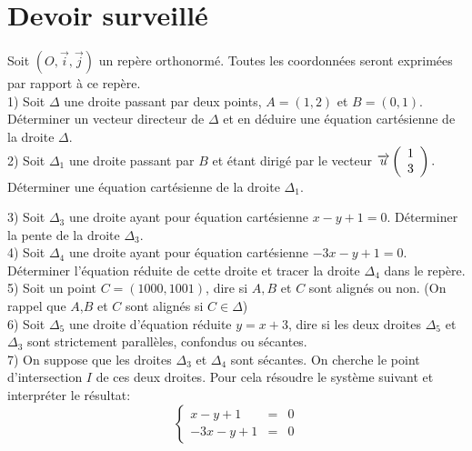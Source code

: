 \documentclass[french]{book}
\begin{document}
 \section*{Devoir surveillé }
Soit $(O,\overrightarrow{i},\overrightarrow{j})$ un repère orthonormé. Toutes les coordonnées seront exprimées par rapport à ce repère. \\


1) Soit $\Delta$ une droite passant par deux points, $A=(1,2)$ et $B=(0,1)$. Déterminer un vecteur directeur de $\Delta$ et en déduire une équation cartésienne de la droite $\Delta$. \\


2) Soit $\Delta_1 $ une droite passant par $B$ et étant dirigé par le vecteur $\overrightarrow{u} \left( \begin{array}{c}
1 \\
3 \\
\end{array} \right). \\
$
Déterminer  une équation cartésienne de la droite $\Delta_1$.

3) Soit $\Delta_3 $ une droite ayant pour équation cartésienne $x-y+1=0$. Déterminer la pente de la droite  $\Delta_3 $. \\

4) Soit $\Delta_4$ une droite ayant pour équation cartésienne $-3x-y+1=0$. Déterminer l'équation réduite de cette droite et tracer la droite $\Delta_4$  dans le repère.\\

5) Soit un point $C=(1000,1001)$, dire si $A,B$ et $C$ sont alignés ou non. (On rappel que $A$,$B$ et $C$ sont alignés si $C \in \Delta$) \\

6) Soit $\Delta_5$ une droite d'équation réduite $y=x+3$, dire si les deux droites $\Delta_5$ et $\Delta_3 $ sont strictement parallèles, confondus ou sécantes. \\

7) On suppose que les droites $\Delta_3$ et $\Delta_4$ sont sécantes. On cherche le point d'intersection $I$ de ces deux droites. Pour cela résoudre le système suivant et interpréter le résultat: \\

$$
\left \{
\begin{array}{rcl}
x-y+1&=&0 \\
-3x-y+1&=&0
\end{array}
\right. 
$$

\end{document}
